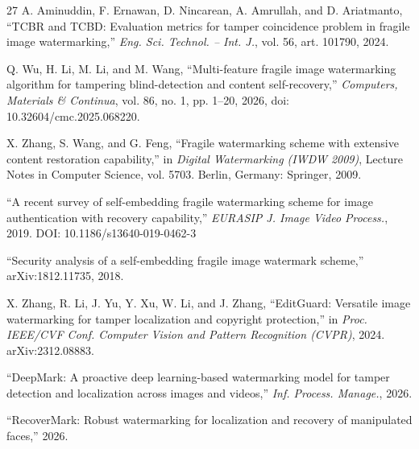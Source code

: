 \begin{thebibliography}{27}
 A. Aminuddin, F. Ernawan, D. Nincarean, A. Amrullah, and D. Ariatmanto, ``TCBR and TCBD: Evaluation metrics for tamper coincidence problem in fragile image watermarking,'' \emph{Eng. Sci. Technol. -- Int. J.}, vol. 56, art. 101790, 2024.

 Q. Wu, H. Li, M. Li, and M. Wang, ``Multi-feature fragile image watermarking algorithm for tampering blind-detection and content self-recovery,'' \emph{Computers, Materials \& Continua}, vol. 86, no. 1, pp. 1--20, 2026, doi: 10.32604/cmc.2025.068220.

 X. Zhang, S. Wang, and G. Feng, ``Fragile watermarking scheme with extensive content restoration capability,'' in \emph{Digital Watermarking (IWDW 2009)}, Lecture Notes in Computer Science, vol. 5703. Berlin, Germany: Springer, 2009.

 ``A recent survey of self-embedding fragile watermarking scheme for image authentication with recovery capability,'' \emph{EURASIP J. Image Video Process.}, 2019. DOI: 10.1186/s13640-019-0462-3

 ``Security analysis of a self-embedding fragile image watermark scheme,'' arXiv:1812.11735, 2018.

 X. Zhang, R. Li, J. Yu, Y. Xu, W. Li, and J. Zhang, ``EditGuard: Versatile image watermarking for tamper localization and copyright protection,'' in \emph{Proc. IEEE/CVF Conf. Computer Vision and Pattern Recognition (CVPR)}, 2024. arXiv:2312.08883.

 ``DeepMark: A proactive deep learning-based watermarking model for tamper detection and localization across images and videos,'' \emph{Inf. Process. Manage.}, 2026.

 ``RecoverMark: Robust watermarking for localization and recovery of manipulated faces,'' 2026.

\end{thebibliography}
